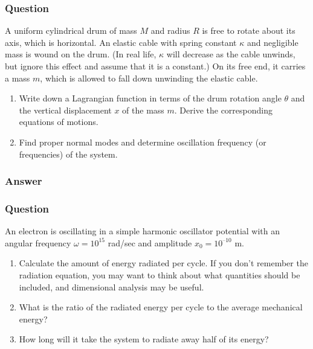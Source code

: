 \subsubsection{Question}
A uniform cylindrical drum of mass $M$ and radius $R$ is free to rotate about its axis, which is horizontal. An elastic cable with spring constant $\kappa$ and negligible mass is wound on the drum. (In real life, $\kappa$ will decrease as the cable unwinds, but ignore this effect and assume that it is a constant.) On its free end, it carries a mass $m$, which is allowed to fall down unwinding the elastic cable.
\begin{enumerate}
	\item Write down a Lagrangian function in terms of the drum rotation angle $\theta$ and the vertical displacement $x$ of the mass $m$. Derive the corresponding equations of motions.
	\item Find proper normal modes and determine oscillation frequency (or frequencies) of the system.
\end{enumerate}
\subsubsection{Answer}


\subsubsection{Question}
An electron is oscillating in a simple harmonic oscillator potential with an angular frequency $\omega=10^{15}$ rad/sec and amplitude $x_0 = 10^{–10}$ m.
\begin{enumerate}
	\item Calculate the amount of energy radiated per cycle. If you don’t remember the radiation equation, you may want to think about what quantities should be included, and dimensional analysis may be useful.
	\item What is the ratio of the radiated energy per cycle to the average mechanical energy?
	\item How long will it take the system to radiate away half of its energy?
\end{enumerate}
